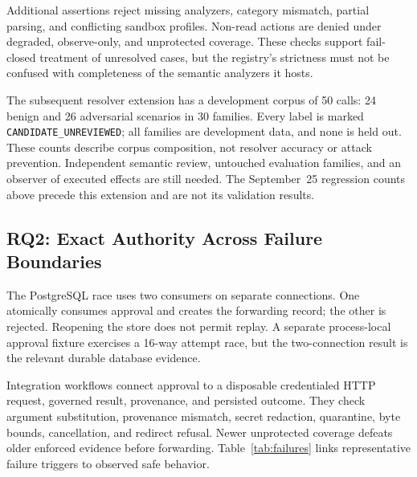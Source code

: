 \documentclass[conference,letterpaper]{IEEEtran}
\newcommand{\state}[1]{\texttt{#1}}
\begin{document}
Additional assertions reject missing analyzers, category mismatch, partial parsing, and conflicting sandbox profiles. Non-read actions are denied under degraded, observe-only, and unprotected coverage. These checks support fail-closed treatment of unresolved cases, but the registry's strictness must not be confused with completeness of the semantic analyzers it hosts.

The subsequent resolver extension has a development corpus of 50 calls: 24 benign and 26 adversarial scenarios in 30 families. Every label is marked \state{CANDIDATE\_UNREVIEWED}; all families are development data, and none is held out. These counts describe corpus composition, not resolver accuracy or attack prevention. Independent semantic review, untouched evaluation families, and an observer of executed effects are still needed. The September~25 regression counts above precede this extension and are not its validation results.

\subsection{RQ2: Exact Authority Across Failure Boundaries}
The PostgreSQL race uses two consumers on separate connections. One atomically consumes approval and creates the forwarding record; the other is rejected. Reopening the store does not permit replay. A separate process-local approval fixture exercises a 16-way attempt race, but the two-connection result is the relevant durable database evidence.

Integration workflows connect approval to a disposable credentialed HTTP request, governed result, provenance, and persisted outcome. They check argument substitution, provenance mismatch, secret redaction, quarantine, byte bounds, cancellation, and redirect refusal. Newer unprotected coverage defeats older enforced evidence before forwarding. Table~\ref{tab:failures} links representative failure triggers to observed safe behavior.
\end{document}
